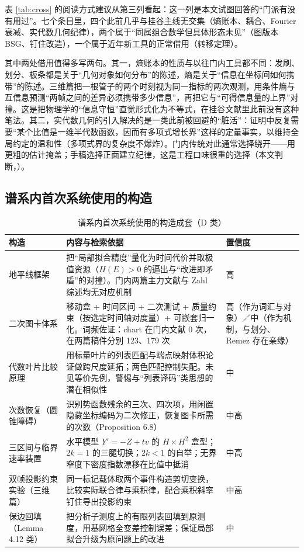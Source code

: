 表 \ref{tab:cross} 的阅读方式建议从第三列看起：这一列是本文试图回答的“门派有没有用过”。七个条目里，四个此前几乎与挂谷主线无交集（熵账本、耦合、Fourier 衰减、实代数几何纪律），两个属于“同属组合数学但具体形态未见”（图版本 BSG、钉住改造），一个属于近年新工具的正常借用（转移定理）。

其中两处借用值得多写两句。其一，熵账本的性质与以往门内工具都不同：发刷、划分、板条都是关于“几何对象如何分布”的陈述，熵是关于“信息在坐标间如何携带”的陈述。三维篇把一根管子的两个时刻视为同一指标的两次观测，用条件熵与互信息预测“两帧之间的差异必须携带多少信息”，再把它与“可得信息量的上界”对撞。这是把物理学的“信息守恒”直觉形式化为不等式，在挂谷文献里此前没有这种笔法。其二，实代数几何的引入解决的是一类此前被回避的“脏活”：证明中反复需要“某个比值是一维半代数函数，因而有多项式增长界”这样的定量事实，以维持全局约定的温和性（多项式界的复杂度不爆炸）。门内传统对此通常选择绕开——用更粗的估计掩盖；手稿选择正面建立纪律，这是工程口味很重的选择（本文判断，\cfM）。

\subsection{谱系内首次系统使用的构造}

\begin{table}[t]
\centering
\caption{谱系内首次系统使用的构造成套（D 类）}
\label{tab:novel}
\footnotesize
\begin{tabularx}{\textwidth}{@{}L{3.0cm}XL{1.4cm}@{}}
\toprule
{}\textbf{构造} & \textbf{内容与检索依据} & \textbf{置信度} \\
\midrule
地平线框架 & 把“局部拟合精度”量化为时间代价并取极值资源（$H(E)>0$ 的逼出与“改进即矛盾”的对撞）。门内两篇主力文献与 Zahl 综述均无对应机制 & 高 \\
二次图卡体系 & 移动盒 + 时间区间 + 二次测试 + 质量约束（按选定时间轴对度量）+ 可嵌套归一化。词频佐证：chart 在门内文献 0 次，在两篇稿件分别 123、179 次 & 高（作为词汇与对象）／中（作为机制，与划分、Remez 存在亲缘） \\
代数叶片比较原理 & 用标量叶片的列表匹配与端点映射体积论证做跨尺度延拓；两色匹配控制失配。未见等价先例，警惕与“列表译码”类思想的潜在相似性 & 中 \\
次数恢复（圆锥障碍） & 识别势函数残余的三次、四次项，用闲置隐藏坐标编码为二次修正，恢复图卡所需的次数（Proposition 6.8） & 中高 \\
三区间与临界速率装置 & 水平模型 $Y'=-Z+tv$ 的 $H\times H^{2}$ 盒型；$2k=1$ 的三腿切换；$2k<1$ 的自举；无界窄度下密度指数漂移在比值中抵消 & 中高 \\
双帧投影约束实验（三维篇） & 同一标记载体取两个事件构造剪切变换，比较实际联合律与乘积律，配合乘积斜率钉住导出投影约束 & 中高 \\
保边回填（Lemma 4.12 类） & 把分析子测度上的有限列表回填到原测度，用基网格全变差控制误差；保证局部拟合升级为原问题上的改进 & 中 \\
\bottomrule
\end{tabularx}
\end{table}

